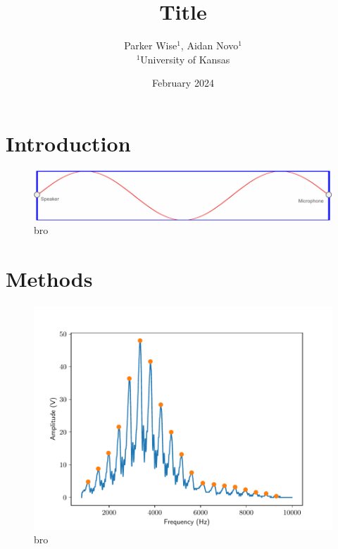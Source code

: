 \documentclass[a4paper, 11pt, twocolumn]{article}
\begin{document}
\title{Title}
\author{Parker Wise$^{1}$, Aidan Novo$^{1}$\\$^{1}$University of Kansas}
\date{February 2024}

\section{Introduction}
\begin{figure}[h]
	\centering
	\includegraphics[scale=1]{box.pdf}
	\caption{bro}
	\label{fig:damped}
\end{figure}
\section{Methods}
\begin{figure}[h]
	\centering
	\includegraphics[scale=1]{../peaks.pdf}
	\caption{bro}
	\label{fig:damped}
\end{figure}
\end{document}
